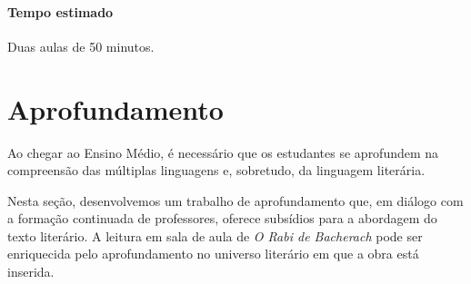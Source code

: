 \documentclass[12pt]{extarticle}
\begin{document}
\paragraph{Tempo estimado} Duas aulas de 50 minutos.



\section{Aprofundamento}

Ao chegar ao Ensino Médio, é necessário que os estudantes se aprofundem
na compreensão das múltiplas linguagens e, sobretudo, da linguagem
literária. 

\begin{comment}Em relação à literatura, a \textsc{bncc} traz as seguintes
considerações:

\begin{quote}
{[}\ldots{}{]} a leitura do texto literário, que ocupa o centro do trabalho
no Ensino Fundamental, deve permanecer nuclear também no Ensino Médio.
Por força de certa simplificação didática, as biografias de autores, as
características de épocas, os resumos e outros gêneros artísticos
substitutivos, como o cinema e as \textsc{hq}s, têm relegado o texto literário a
um plano secundário do ensino. Assim, é importante não só (re)colocá"-lo
como ponto de partida para o trabalho com a literatura, como
intensificar seu convívio com os estudantes. Como linguagem
artisticamente organizada, a literatura enriquece nossa percepção e
nossa visão de mundo. Mediante arranjos especiais das palavras, ela cria
um universo que nos permite aumentar nossa capacidade de ver e sentir.
Nesse sentido, a literatura possibilita uma ampliação da nossa visão do
mundo, ajuda"-nos não só a ver mais, mas a colocar em questão muito do
que estamos vendo/vivenciando. (Brasil, 2018, p. 491)
\end{quote}
\end{comment}

Nesta seção, desenvolvemos um trabalho de aprofundamento que, em diálogo
com a formação continuada de professores, oferece subsídios para a
abordagem do texto literário. A leitura em sala de aula de \emph{O Rabi
de Bacherach} pode ser enriquecida pelo aprofundamento no universo
literário em que a obra está inserida.

\end{document}
